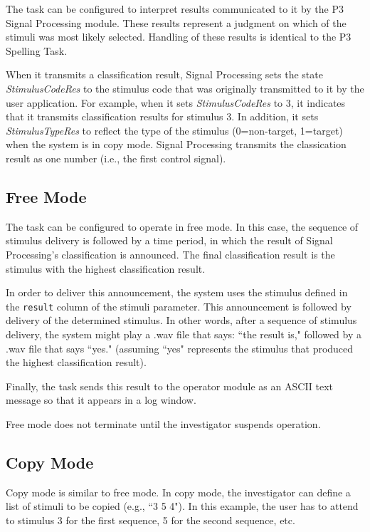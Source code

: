 \documentclass[letterpaper,oneside,12pt]{article}
\begin{document}
The task can be configured to interpret results communicated to it by the P3 
Signal Processing module. These results represent a judgment on which of the 
stimuli was most likely selected. Handling of these results is identical to the 
P3 Spelling Task. 

When it transmits a classification result, Signal Processing sets the state 
\emph{StimulusCodeRes} to the stimulus code that was originally transmitted to 
it by the user application. For example, when it sets \emph{StimulusCodeRes} to 
3, it indicates that it transmits classification results for stimulus 3. In 
addition, it sets \emph{StimulusTypeRes} to reflect the type of the stimulus 
(0=non-target, 1=target) when the system is in copy mode. Signal Processing 
transmits the classication result as one number (i.e., the first control signal).

\subsection{Free Mode}

The task can be configured to operate in free mode. In this case, the sequence 
of stimulus delivery is followed by a time period, in which the result of Signal 
Processing's classification is announced. The final classification result is
the stimulus with the highest classification result.

In order to deliver this announcement, the system uses the stimulus defined in 
the \texttt{result} column of the stimuli parameter. This announcement is 
followed by delivery of the determined stimulus. In other words, after a 
sequence of stimulus delivery, the system might play a .wav file that says: ``the 
result is," followed by a .wav file that says ``yes." (assuming ``yes" represents
the stimulus that produced the highest classification result).

Finally, the task sends this result to the operator module as an ASCII text 
message so that it appears in a log window.

Free mode does not terminate until the investigator suspends operation.


\subsection{Copy Mode}

Copy mode is similar to free mode. In copy mode, the investigator can define a 
list of stimuli to be copied (e.g., ``3 5 4"). In this example, the user has to 
attend to stimulus 3 for the first sequence, 5 for the second sequence, etc.
\end{document}
